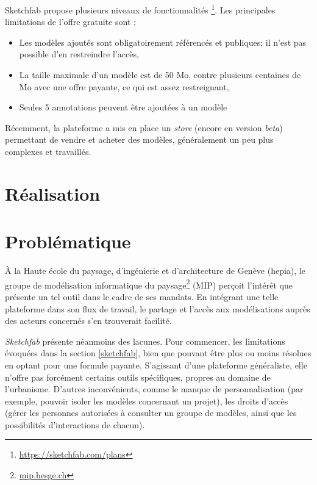 Sketchfab propose plusieurs niveaux de fonctionnalités \footnote{\url{https://sketchfab.com/plans}}. Les principales limitations de l'offre gratuite sont :
\begin{itemize}
    \item Les modèles ajoutés sont obligatoirement référencés et publiques; il n'est pas possible d'en restreindre l'accès,
    \item La taille maximale d'un modèle est de 50 Mo, contre plusieurs centaines de Mo avec une offre payante, ce qui est assez restreignant,
    \item Seules 5 annotations peuvent être ajoutées à un modèle
\end{itemize}

Récemment, la plateforme a mis en place un \textit{store} (encore en version \textit{beta}) permettant de vendre et acheter des modèles, généralement un peu plus complexes et travaillés.

\section{Réalisation}

\section{Problématique}

À la Haute école du paysage, d'ingénierie et d'architecture de Genève (hepia), le groupe de modélisation informatique du paysage\footnote{\url{mip.hesge.ch}} (MIP) perçoit l'intérêt que présente un tel outil dans le cadre de ses mandats. En intégrant une telle plateforme dans son flux de travail, le partage et l'accès aux modélisations auprès des acteurs concernés s'en trouverait facilité.

\textit{Sketchfab} présente néanmoins des lacunes. Pour commencer, les limitations évoquées dans la section \ref{sketchfab}, bien que pouvant être plus ou moins résolues en optant pour une formule payante.
S'agissant d'une plateforme généraliste, elle n'offre pas forcément certains outils spécifiques, propres au domaine de l'urbanisme. D'autres inconvénients, comme le manque de personnalisation (par exemple, pouvoir isoler les modèles concernant un projet), les droits d'accès (gérer les personnes autorisées à consulter un groupe de modèles, ainsi que les possibilités d'interactions de chacun).



